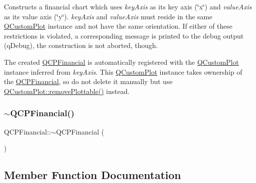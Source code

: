 Constructs a financial chart which uses {\itshape key\+Axis} as its key axis (\char`\"{}x\char`\"{}) and {\itshape value\+Axis} as its value axis (\char`\"{}y\char`\"{}). {\itshape key\+Axis} and {\itshape value\+Axis} must reside in the same \mbox{\hyperlink{class_q_custom_plot}{Q\+Custom\+Plot}} instance and not have the same orientation. If either of these restrictions is violated, a corresponding message is printed to the debug output (q\+Debug), the construction is not aborted, though.

The created \mbox{\hyperlink{class_q_c_p_financial}{Q\+C\+P\+Financial}} is automatically registered with the \mbox{\hyperlink{class_q_custom_plot}{Q\+Custom\+Plot}} instance inferred from {\itshape key\+Axis}. This \mbox{\hyperlink{class_q_custom_plot}{Q\+Custom\+Plot}} instance takes ownership of the \mbox{\hyperlink{class_q_c_p_financial}{Q\+C\+P\+Financial}}, so do not delete it manually but use \mbox{\hyperlink{class_q_custom_plot_af3dafd56884208474f311d6226513ab2}{Q\+Custom\+Plot\+::remove\+Plottable()}} instead. \mbox{\label{class_q_c_p_financial_ad1fda0d793797b66819fac4682b10f31}} 
\subsubsection{\texorpdfstring{$\sim$QCPFinancial()}{~QCPFinancial()}}
{\footnotesize\ttfamily Q\+C\+P\+Financial\+::$\sim$\+Q\+C\+P\+Financial (\begin{DoxyParamCaption}{ }\end{DoxyParamCaption})\hspace{0.3cm}{\ttfamily [virtual]}}



\subsection{Member Function Documentation}
\mbox{\label{class_q_c_p_financial_a372ac031e44a7a6c912d203556af96f7}} 
